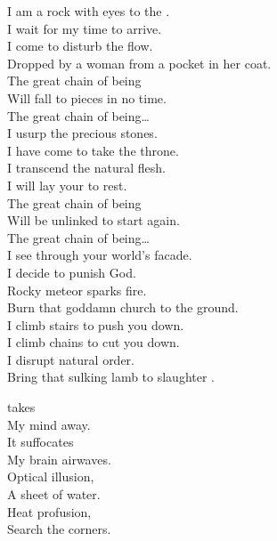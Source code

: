 I am a rock with eyes to the . \\
I wait for my time to arrive. \\
I come to disturb the flow. \\
Dropped by a woman from a pocket in her coat. \\

The great chain of being \\
Will fall to pieces in no time. \\

The great chain of being… \\

I usurp the precious stones. \\
I have come to take the throne. \\
I transcend the natural flesh. \\
I will lay your  to rest. \\

The great chain of being \\
Will be unlinked to start again. \\

The great chain of being… \\

I see through your world's facade. \\
I decide to punish God. \\
Rocky meteor sparks fire. \\
Burn that goddamn church to the ground. \\

I climb stairs to push you down. \\
I climb chains to cut you down. \\
I disrupt natural order. \\
Bring that sulking lamb to slaughter . \\





 takes \\
My mind away. \\
It suffocates \\
My brain airwaves. \\

Optical illusion, \\
A sheet of water. \\
Heat profusion, \\
Search the corners. \\

